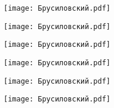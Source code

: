 \documentclass[main.tex]{subfiles}
\begin{document}
\begin{center}
\texttt{[image: Брусиловский.pdf]}
\end{center}

\begin{center}
\texttt{[image: Брусиловский.pdf]}
\end{center}

\begin{center}
\texttt{[image: Брусиловский.pdf]}
\end{center}

\begin{center}
\texttt{[image: Брусиловский.pdf]}
\end{center}

\begin{center}
\texttt{[image: Брусиловский.pdf]}
\end{center}

\begin{center}
\texttt{[image: Брусиловский.pdf]}
\end{center}
\end{document}
